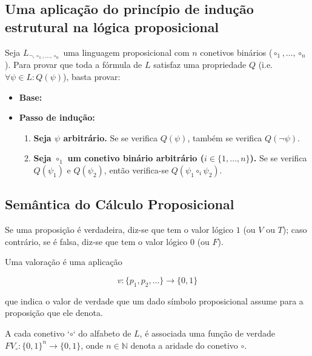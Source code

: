 \subsection{Uma aplicação do princípio de indução estrutural na lógica proposicional}

Seja $L_{\neg,\circ_1,\ldots,\circ_n}$ uma linguagem proposicional com $n$ conetivos binários ($\circ_1,\ldots,\circ_n$). Para provar que toda a fórmula de $L$ satisfaz uma propriedade $Q$ (i.e. $\forall \psi \in L : Q(\psi)$), basta provar:

\begin{itemize}
    \item \textbf{Base:}
    \item \textbf{Passo de indução:}
    \begin{enumerate}[label=(\roman*)]
        \item \textbf{Seja $\psi$ arbitrário.} Se se verifica $Q(\psi)$, também se verifica $Q(\neg\psi)$.
        \item \textbf{Seja $\circ_1$ um conetivo binário arbitrário ($i \in \{1,\ldots,n\}$).} Se se verifica $Q(\psi_1)$ e $Q(\psi_2)$, então verifica-se $Q(\psi_1 \circ_i \psi_2)$.
    \end{enumerate}
\end{itemize}

\subsection{Semântica do Cálculo Proposicional}
Se uma proposição é verdadeira, diz-se que tem o valor lógico $1$ (ou $V$ ou $T$); caso contrário, se é falsa, diz-se que tem o valor lógico $0$ (ou $F$).

\begin{definition}
    Uma valoração é uma aplicação

    \[
        v:\{p_1,p_2,\ldots\}\to\{0,1\}
    \]

    que indica o valor de verdade que um dado símbolo proposicional assume para a proposição que ele denota.
\end{definition}

A cada conetivo `$\circ$` do alfabeto de $L$, é associada uma função de verdade $FV_{\circ}:\{0,1\}^n\to\{0,1\}$, onde $n \in \mathbb{N}$ denota a aridade do conetivo $\circ$.

